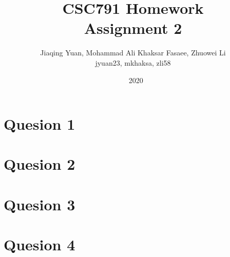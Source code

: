 \documentclass{article}
\title{CSC791 Homework\\ Assignment 2}
\author{Jiaqing Yuan, Mohammad Ali Khaksar Fasaee, Zhuowei Li\\ jyuan23, mkhaksa, zli58}
\date{~ 2020}
\begin{document}
\maketitle

\section{Quesion 1}

\section{Quesion 2}

\section{Quesion 3}

\section{Quesion 4}




\end{document}

